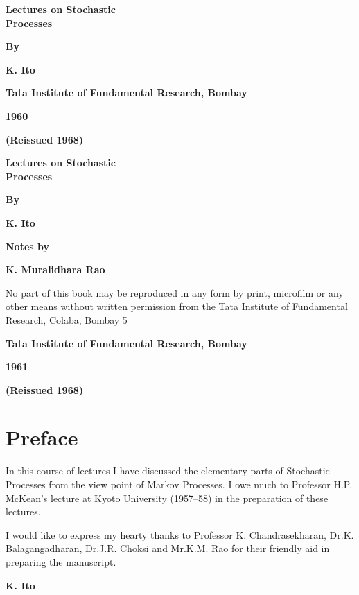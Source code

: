 \thispagestyle{empty}
\begin{center}
{\Large\bf Lectures on Stochastic}\\[5pt]
{\Large\bf Processes}
\vskip 1cm

{\bf By}
\medskip

{\bf K. Ito}
\vfill

{\bf Tata Institute of Fundamental Research, Bombay}

{\bf 1960}

{\bf (Reissued 1968)}
\end{center}

\eject

\thispagestyle{empty}
\begin{center}
{\Large\bf Lectures on Stochastic}\\[5pt]
{\Large\bf Processes}
\vskip 1cm

{\bf By}
\medskip

{\large\bf K. Ito}
\vfill

{\bf Notes by}
\medskip

{\large\bf K. Muralidhara Rao}
\vfill

\parbox{0.7\textwidth}{No part of this book may be
reproduced in any form by print, microfilm or any
other means without written permission from the
Tata Institute of Fundamental Research, Colaba, Bombay 5}
\vfill

{\bf Tata Institute of Fundamental Research, Bombay}

{\bf 1961}

{\bf (Reissued 1968)}
\end{center}

\eject

\chapter*{Preface}

In this course of lectures I have discussed the elementary
parts of Stochastic Processes from the view point of 
Markov Processes. I owe much to Professor H.P. McKean's lecture
at Kyoto University (1957--58) in the preparation of these lectures.

I would like to express my hearty thanks to Professor 
K. Chandrasekharan, Dr.K. Balagangadharan, Dr.J.R. Choksi
and Mr.K.M. Rao for their friendly aid in preparing the manuscript.

\begin{flushright}
{\large\bf K. Ito}
\end{flushright}
